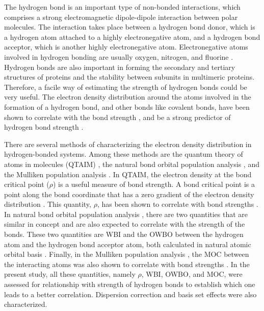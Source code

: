 \documentclass[11pt]{report}
\begin{document}
The hydrogen bond is an important type of non-bonded interactions, which comprises a strong electromagnetic dipole-dipole interaction between polar molecules. The interaction takes place between a hydrogen bond donor, which is a hydrogen atom attached to a highly electronegative atom, and a hydrogen bond acceptor, which is another highly electronegative atom. Electronegative atoms involved in hydrogen bonding are usually oxygen, nitrogen, and fluorine
\cite{Arunan2011-1,Arunan2011-2,Desiraju2002}. 
Hydrogen bonds are also important in forming the secondary and tertiary structures of proteins and the stability between subunits in multimeric proteins\cite{Deechongkit2004,Rose2006,Hellgren2007}. 
Therefore, a facile way of estimating the strength of hydrogen bonds could be very useful. The electron density distribution around the atoms involved in the formation of a hydrogen bond, and other bonds like covalent bonds, have been shown to correlate with the bond strength
\cite{Davidson1967,Roby1974,Ehrhardt1985}, 
and be a strong predictor of hydrogen bond strength
\cite{Reiher2001,Thar2006,Schmidt2008,Schenk2008,Grabowski2001,Gora2005,Parthasarathi2005,Parthasarathi2006,Gatti1994}.

There are several methods of characterizing the electron
density distribution in hydrogen-bonded systems. Among these methods are the quantum theory of atoms in molecules (QTAIM)
\cite{Bader1990,Bader1991}, the natural bond orbital population analysis
\cite{Glendening2012}, and the Mulliken population analysis
\cite{Mulliken1955}.
In QTAIM, the electron density at the bond critical
point ($\rho$) is a useful measure of bond strength. A bond critical point is a point along the bond coordinate that has a zero gradient of the electron density distribution
\cite{Bader1990,Bader1991}. 
This quantity, $\rho$, has been shown to correlate with bond strengths
\cite{Grabowski2001,Gora2005,Parthasarathi2005,Parthasarathi2006,Gatti1994,Grabowski2000,Alkorta1998}. In natural bond orbital population analysis
\cite{Glendening2012}, there are two quantities that are similar in concept and are also expected to correlate with the strength of the bonds. These two quantities are \gls{WBI}
\cite{Wiberg1968} and the \gls{OWBO}
\cite{Reed1983,Reed1985} 
between the hydrogen atom and the hydrogen bond acceptor atom, both calculated in natural atomic orbital basis
\cite{Glendening2012}. 
Finally, in the Mulliken population analysis
\cite{Mulliken1955}, 
the \gls{MOC} between the interacting atoms was also shown to correlate with bond strengths
\cite{Ehrhardt1985}. In the present study, all these quantities, namely $\rho$, WBI, OWBO, and MOC, were assessed for relationship with strength of hydrogen bonds to establish which one leads to a better correlation. Dispersion correction and basis set effects were also characterized.
\end{document}
